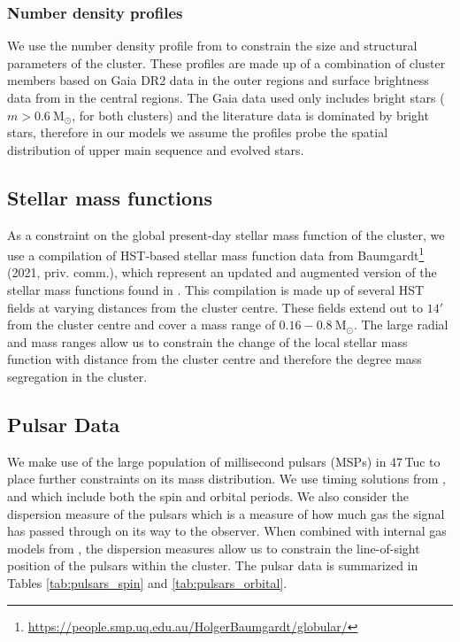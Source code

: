 \subsubsection{Number density profiles}
We use the number density profile from \citet{DeBoer2019} to constrain the size and structural
parameters of the cluster. These profiles are made up of a combination of cluster members based on
Gaia DR2 data in the outer regions and surface brightness data from \citet{Trager1995} in the
central regions. The Gaia data used only includes bright stars ($m > 0.6 \ \mathrm{M}_\odot$, for
both clusters) and the literature data is dominated by bright stars, therefore in our models we
assume the profiles probe the spatial distribution of upper main sequence and evolved stars.


\subsection{Stellar mass functions}
As a constraint on the global present-day stellar mass function of the cluster, we use a compilation
of HST-based stellar mass function data from
Baumgardt\footnote{\url{https://people.smp.uq.edu.au/HolgerBaumgardt/globular/}} (2021, priv.
comm.), which represent an updated and augmented version of the stellar mass functions found in
\citet{Sollima2017}. This compilation is made up of several HST fields at varying distances from the
cluster centre. These fields extend out to $14 '$ from the cluster centre and cover a mass range of
$0.16 - 0.8 \ \mathrm{M}_\odot$. The large radial and mass ranges allow us to constrain the change
of the local stellar mass function with distance from the cluster centre and therefore the degree
mass segregation in the cluster.


\subsection{Pulsar Data}
We make use of the large population of millisecond pulsars (MSPs) in 47\,Tuc to place further
constraints on its mass distribution. We use timing solutions from \citet{Freire2017},
\citet{Ridolfi2016} and \citet{Freire2018} which include both the spin and orbital periods. We also
consider the dispersion measure of the pulsars which is a measure of how much gas the signal has
passed through on its way to the observer. When combined with internal gas models from
\citet{Abbate2018}, the dispersion measures allow us to constrain the line-of-sight position of the
pulsars within the cluster. The pulsar data is summarized in Tables \ref{tab:pulsars_spin} and
\ref{tab:pulsars_orbital}.





